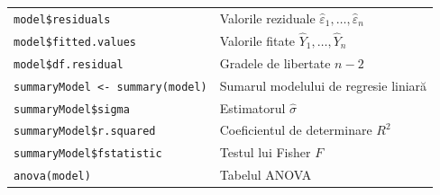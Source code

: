 \documentclass[]{article}
\begin{document}
\begin{longtable}[]{@{}ll@{}}
\begin{minipage}[t]{0.49\columnwidth}\raggedright\strut
\texttt{model\$residuals}\strut
\end{minipage} & \begin{minipage}[t]{0.45\columnwidth}\raggedright\strut
Valorile reziduale \(\hat\varepsilon_1,\ldots,\hat\varepsilon_n\)\strut
\end{minipage}\tabularnewline
\begin{minipage}[t]{0.49\columnwidth}\raggedright\strut
\texttt{model\$fitted.values}\strut
\end{minipage} & \begin{minipage}[t]{0.45\columnwidth}\raggedright\strut
Valorile fitate \(\hat Y_1,\ldots,\hat Y_n\)\strut
\end{minipage}\tabularnewline
\begin{minipage}[t]{0.49\columnwidth}\raggedright\strut
\texttt{model\$df.residual}\strut
\end{minipage} & \begin{minipage}[t]{0.45\columnwidth}\raggedright\strut
Gradele de libertate \(n-2\)\strut
\end{minipage}\tabularnewline
\begin{minipage}[t]{0.49\columnwidth}\raggedright\strut
\texttt{summaryModel\ \textless{}-\ summary(model)}\strut
\end{minipage} & \begin{minipage}[t]{0.45\columnwidth}\raggedright\strut
Sumarul modelului de regresie liniară\strut
\end{minipage}\tabularnewline
\begin{minipage}[t]{0.49\columnwidth}\raggedright\strut
\texttt{summaryModel\$sigma}\strut
\end{minipage} & \begin{minipage}[t]{0.45\columnwidth}\raggedright\strut
Estimatorul \(\hat\sigma\)\strut
\end{minipage}\tabularnewline
\begin{minipage}[t]{0.49\columnwidth}\raggedright\strut
\texttt{summaryModel\$r.squared}\strut
\end{minipage} & \begin{minipage}[t]{0.45\columnwidth}\raggedright\strut
Coeficientul de determinare \(R^2\)\strut
\end{minipage}\tabularnewline
\begin{minipage}[t]{0.49\columnwidth}\raggedright\strut
\texttt{summaryModel\$fstatistic}\strut
\end{minipage} & \begin{minipage}[t]{0.45\columnwidth}\raggedright\strut
Testul lui Fisher \(F\)\strut
\end{minipage}\tabularnewline
\begin{minipage}[t]{0.49\columnwidth}\raggedright\strut
\texttt{anova(model)}\strut
\end{minipage} & \begin{minipage}[t]{0.45\columnwidth}\raggedright\strut
Tabelul ANOVA\strut
\end{minipage}\tabularnewline
\bottomrule
\end{longtable}
\end{document}
